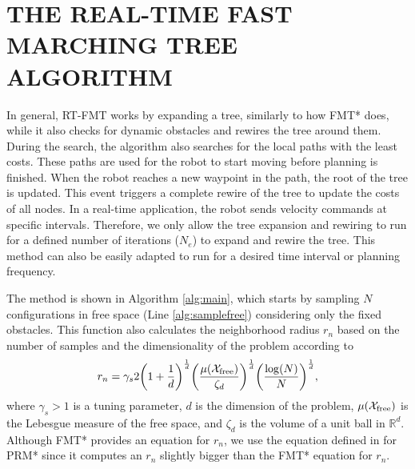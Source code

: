 \section{THE REAL-TIME FAST MARCHING TREE ALGORITHM}
\label{sec:algorithm}
In general, RT-FMT works by expanding a tree, similarly to how FMT* does, while it also checks for dynamic obstacles and rewires the tree around them. During the search, the algorithm also searches for the local paths with the least costs. These paths are used for the robot to start moving before planning is finished. When the robot reaches a new waypoint in the path, the root of the tree is updated. This event triggers a complete rewire of the tree to update the costs of all nodes. In a real-time application, the robot sends velocity commands at specific intervals. Therefore, we only allow the tree expansion and rewiring to run for a defined number of iterations ($N_e$) to expand and rewire the tree. This method can also be easily adapted to run for a desired time interval or planning frequency. 

The method is shown in Algorithm \ref{alg:main}, which starts by sampling $N$ configurations in free space (Line \ref{alg:samplefree}) considering only the fixed obstacles. This function also calculates the neighborhood radius $r_n$ based on the number of samples and the dimensionality of the problem according to
\begin{equation}
\label{eq:rn}
    r_n = \gamma_s 2\bigg(1 +\frac{1}{d}\bigg)^{\frac{1}{d}}\bigg(\frac{\mu(\mathcal{X}_{\rm free})}{\zeta_d} \bigg)^\frac{1}{d} \bigg(\frac{\log(N)}{N} \bigg)^\frac{1}{d},
\end{equation}
where $\gamma_s > 1$ is a tuning parameter, $d$ is the dimension of the problem, $\mu(\mathcal{X}_{\rm free})$ is the Lebesgue measure of the free space, and $\zeta_d$ is the volume of a unit ball in $\mathbb{R}^d$. Although FMT* provides an equation for $r_n$, we use the equation defined in \cite{karaman2011sampling} for PRM* since it computes an $r_n$ slightly bigger than the FMT* equation for $r_n$.


